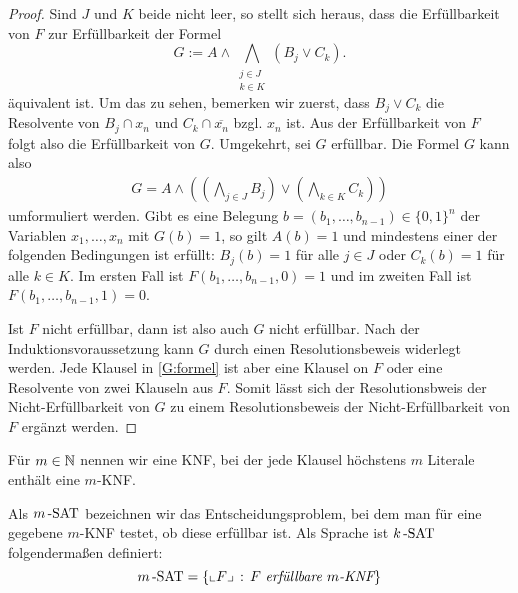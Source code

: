 \begin{proof}
	Sind $J$ und $K$ beide  nicht leer, so stellt sich heraus, dass die Erfüllbarkeit von $F$ zur Erfüllbarkeit der Formel 
	\begin{equation} \label{G:formel} 
			G := A \wedge \bigwedge_{\substack{ j \in J \\ k \in K}} (B_j \vee C_k).
	\end{equation}
	äquivalent ist. 
	Um das zu sehen, bemerken wir zuerst, dass $B_j \vee C_k$ die Resolvente von $B_j \cap x_n$ und $C_k \cap \overline{x_n}$ bzgl. $x_n$ ist. Aus der Erfüllbarkeit von $F$ folgt also die Erfüllbarkeit von $G$. Umgekehrt, sei $G$ erfüllbar. Die Formel $G$ kann also
	\begin{align*}
			G = A \wedge \left( \left( \bigwedge_{j \in J} B_j  \right)  \vee \left( \bigwedge_{k \in K} C_k \right) \right)
	\end{align*}
	umformuliert werden.  Gibt es eine Belegung $b=(b_1,\ldots,b_{n-1}) \in \{0,1\}^n$ der Variablen $x_1,\ldots,x_n$ mit $G(b) = 1$, so gilt $A(b)=1$ und mindestens einer der folgenden Bedingungen ist erfüllt: $B_j(b)=1$ für alle $j \in J$ oder $C_k(b)=1$ für alle $k \in K$. Im ersten Fall ist $F(b_1,\ldots,b_{n-1}, 0 ) =1$ und im zweiten Fall ist $F(b_1,\ldots,b_{n-1},1)=0$. 
	
	Ist $F$ nicht erfüllbar, dann ist also auch $G$ nicht erfüllbar. Nach der Induktionsvoraussetzung kann  $G$ durch einen Resolutionsbeweis widerlegt werden. Jede Klausel in \eqref{G:formel} ist aber eine Klausel on $F$ oder eine Resolvente von zwei Klauseln aus $F$. Somit lässt sich der Resolutionsbweis der Nicht-Erfüllbarkeit von $G$ zu einem Resolutionsbeweis der Nicht-Erfüllbarkeit von $F$ ergänzt werden. 	
\end{proof} 

\begin{defn}
	Für $m \in \mathbb{N}$ nennen wir eine KNF, bei der jede Klausel höchstens $m$ Literale enthält eine $m$-KNF. 
	
	Als ${m}\operatorname{-SAT}$ bezeichnen wir das Entscheidungsproblem, bei dem man für eine gegebene $m$-KNF testet, ob diese erfüllbar ist. Als Sprache ist ${k}\operatorname{-SAT}$ folgendermaßen definiert: 
	\[
		\kSAT{m} = \setcond{\enc{F} }{F \ \emph{erfüllbare $m$-KNF}}
	\]
\end{defn} 

